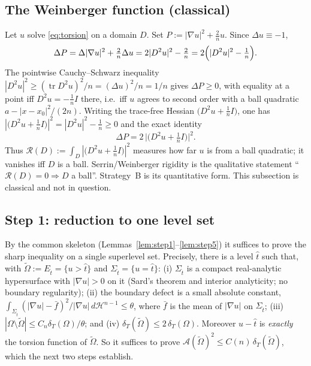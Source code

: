 \documentclass[11pt]{amsart}
\theoremstyle{definition}
\theoremstyle{remark}
\newcommand{\Om}{\Omega}
\newcommand{\Ot}{\widetilde\Omega}
\newcommand{\Et}{E_{\hat t}}
\newcommand{\St}{\Sigma_{\hat t}}
\newcommand{\dT}{\delta_T}
\newcommand{\Asym}{\mathcal A}
\newcommand{\Hess}{D^2u}
\newcommand{\TF}{\bigl(\Hess+\tfrac1n I\bigr)}
\newcommand{\R}{\mathcal R}
\newcommand{\Hn}{\mathcal H^{n-1}}
\DeclareMathOperator{\tr}{tr}
\begin{document}
\subsection{The Weinberger function (classical)}
Let $u$ solve \eqref{eq:torsion} on a domain $D$. Set
$P:=|\nabla u|^2+\tfrac2n u$. Since $\Delta u\equiv-1$,
\[
  \Delta P=\Delta|\nabla u|^2+\tfrac2n\Delta u
  =2|\Hess|^2-\tfrac2n
  =2\Bigl(|\Hess|^2-\tfrac1n\Bigr).
\]
The pointwise Cauchy--Schwarz inequality
$|\Hess|^2\ge(\tr\Hess)^2/n=(\Delta u)^2/n=1/n$ gives $\Delta P\ge0$, with
equality at a point iff $\Hess=-\tfrac1n I$ there, i.e.\ iff $u$ agrees to
second order with a ball quadratic $a-|x-x_0|^2/(2n)$. Writing the trace-free
Hessian $\TF$, one has $|\TF|^2=|\Hess|^2-\tfrac1n\ge0$ and the exact identity
\begin{equation}\label{eq:DP}
  \Delta P=2\,\bigl|\TF\bigr|^2 .
\end{equation}
Thus $\R(D):=\int_D|\TF|^2$ measures how far $u$ is from a ball quadratic; it
vanishes iff $D$ is a ball. Serrin/Weinberger rigidity is the qualitative
statement ``$\R(D)=0\Rightarrow D$ a ball''. Strategy~B is its quantitative
form. This subsection is classical and not in question.

\subsection{Step 1: reduction to one level set}
By the common skeleton (Lemmas~\ref{lem:step1}--\ref{lem:step5}) it suffices
to prove the sharp inequality on a single superlevel set. Precisely, there is
a level $\hat t$ such that, with $\Ot:=\Et=\{u>\hat t\}$ and
$\St=\{u=\hat t\}$:
\textup{(i)} $\St$ is a compact real-analytic hypersurface with
$|\nabla u|>0$ on it (Sard's theorem and interior analyticity; no boundary
regularity);
\textup{(ii)} the boundary defect is a small absolute constant,
$\int_{\St}(|\nabla u|-\bar f)^2/|\nabla u|\,d\Hn\le\theta$, where
$\bar f$ is the mean of $|\nabla u|$ on $\St$;
\textup{(iii)} $|\Om\setminus\Ot|\le C_n\dT(\Om)/\theta$; and
\textup{(iv)} $\dT(\Ot)\le2\,\dT(\Om)$.
Moreover $u-\hat t$ is \emph{exactly} the torsion function of $\Ot$. So it
suffices to prove $\Asym(\Ot)^2\le C(n)\,\dT(\Ot)$, which the next two steps
establish.
\end{document}
